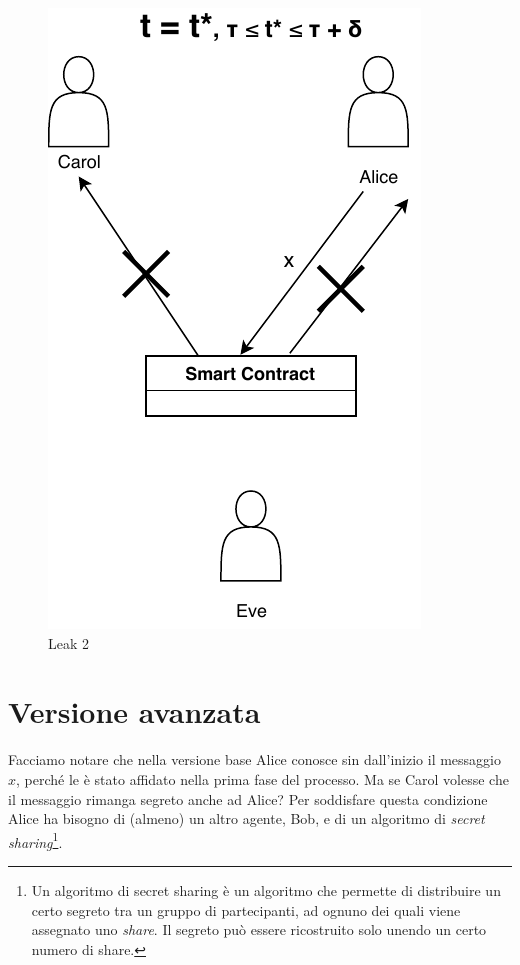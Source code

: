 \begin{figure}[H]
\begin{minipage}{0.4\textwidth}
		\includegraphics[width=.7\linewidth]{images/chap_protocollo/base-leak-2.pdf}
		\caption{Leak 2}
	\end{minipage}
\end{figure}

\section{Versione avanzata}
Facciamo notare che nella versione base
Alice conosce sin
dall'inizio il messaggio
$ x $, perché le è stato affidato nella prima fase del processo.
Ma se Carol volesse che il messaggio rimanga segreto anche ad Alice?
Per soddisfare questa condizione Alice ha bisogno di (almeno) un altro agente,
Bob, e di un
algoritmo di \textit{secret sharing}\footnote{Un algoritmo di secret sharing
	è un algoritmo che permette di
	distribuire un certo segreto tra un gruppo di partecipanti, ad ognuno dei quali viene
	assegnato uno \textit{share}. Il segreto può essere ricostruito solo unendo un certo
	numero di share.}.

